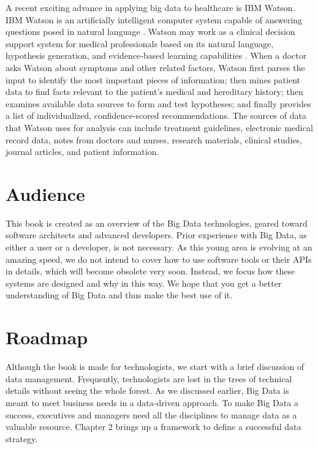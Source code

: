 \documentclass[11pt]{book}
\begin{document}
A recent exciting advance in applying big data to healthcare is IBM Watson. IBM Watson is an artificially intelligent computer system capable of answering questions posed in natural language \cite{Watson2014}.
Watson may work as a clinical decision support system for medical professionals based on its natural language, hypothesis generation, and evidence-based learning capabilities  \cite{Watson2013Healthcare, Watson2013Cancer}. When a doctor asks Watson about symptoms and other related factors, Watson first parses the input to identify the most important pieces of information; then mines patient data to find facts relevant to the patient's medical and hereditary history; then examines available data sources to form and test hypotheses; and finally provides a list of individualized, confidence-scored recommendations. The sources of data that Watson uses for analysis can include treatment guidelines, electronic medical record data, notes from doctors and nurses, research materials, clinical studies, journal articles, and patient information.

\section{Audience}

This book is created as an overview of the Big Data technologies, geared toward software architects and advanced developers. Prior experience with Big Data, as either a user or a developer, is not necessary. As this young area is evolving at an amazing speed, we do not intend to cover how to use software tools or their APIs in details, which will become obsolete very soon. Instead, we focus how these systems are designed and why in this way. We hope that you get a better understanding of Big Data and thus make the best use of it. 

\section{Roadmap}

Although the book is made for technologists, we start with a brief discussion of data management. Frequently, technologists are lost in the trees of technical details without seeing the whole forest. As we discussed earlier, Big Data is meant to meet business needs in a data-driven approach. To make Big Data a success, executives and managers need all the disciplines to manage data as a valuable resource. Chapter 2 brings up a framework to define a successful data strategy. 
\end{document}
